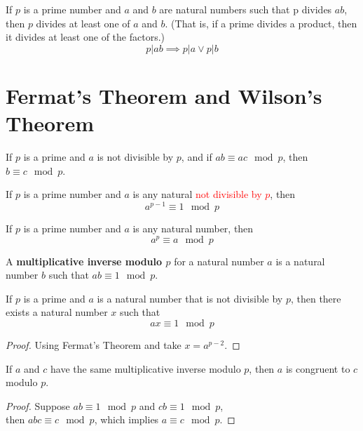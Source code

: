 \documentclass[11pt]{article}
\begin{document}
		\begin{corollary}[4.1.3]
			 If $p$ is a prime number and $a$ and $b$ are natural numbers such that p divides $ab$, then $p$ divides at least one of $a$ and $b$. (That is, if a prime divides a product, then it divides at least one of the factors.)
			 \[
			 	p | ab \implies p | a \lor p | b 
			 \]
		\end{corollary}
	
	\section{Fermat's Theorem and Wilson's Theorem}
		\begin{theorem}[5.1.1]
			If $p$ is a prime and $a$ is not divisible by $p$, and if $ab \equiv ac \mod p$, then $b \equiv c \mod p$.
		\end{theorem}
		
		\begin{theorem}
			If $p$ is a prime number and $a$ is any natural \textcolor{red}{not divisible by $p$}, then 
			\[
				a^{p-1} \equiv 1 \mod p
			\]
		\end{theorem}
		
		\begin{corollary}[5.1.3]
			If $p$ is a prime number and $a$ is any natural number, then 
			\[
				a^p \equiv a \mod p
			\]
		\end{corollary}
		
		\begin{definition}[5.1.4]
			A \textbf{multiplicative inverse modulo $p$} for a natural number $a$ is a natural number $b$ such that $ab \equiv 1 \mod p$.
		\end{definition}
		
		\begin{corollary}[5.1.5]
			If $p$ is a prime and $a$ is a natural number that is not divisible by $p$, then there exists a natural number $x$ such that
			\[
				ax \equiv 1 \mod p
			\]
		\end{corollary}
		\begin{proof}
			Using Fermat's Theorem and take $x = a^{p-2}$.
		\end{proof}
		
		\begin{lemma}[5.1.6]
			If $a$ and $c$ have the same multiplicative inverse modulo $p$, then $a$ is congruent to $c$ modulo $p$.
		\end{lemma}
		\begin{proof}
			Suppose $ab \equiv 1 \mod p$ and $cb \equiv 1 \mod p$, \\
			then $abc \equiv c \mod p$, which implies $a \equiv c \mod p$.
		\end{proof}
		
\end{document}

